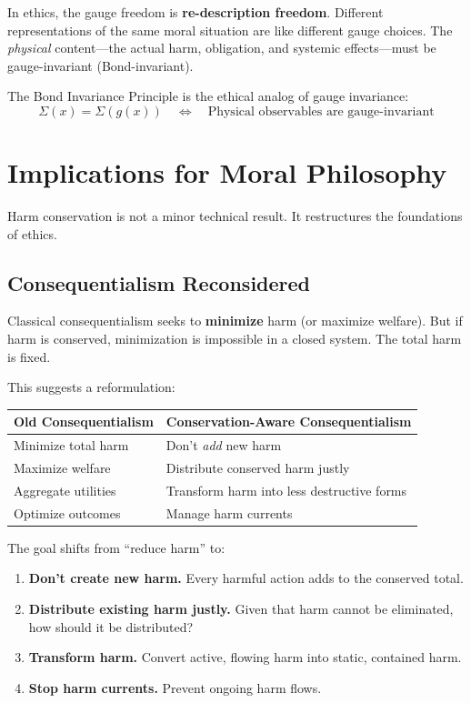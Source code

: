 \documentclass[12pt,letterpaper]{article}
\theoremstyle{definition}
\theoremstyle{remark}
\begin{document}
In ethics, the gauge freedom is \textbf{re-description freedom}. Different representations of the same moral situation are like different gauge choices. The \textit{physical} content---the actual harm, obligation, and systemic effects---must be gauge-invariant (Bond-invariant).

The Bond Invariance Principle is the ethical analog of gauge invariance:
\begin{equation}
\Sigma(x) = \Sigma(g(x)) \quad \Longleftrightarrow \quad \text{Physical observables are gauge-invariant}
\end{equation}

\section{Implications for Moral Philosophy}

Harm conservation is not a minor technical result. It restructures the foundations of ethics.

\subsection{Consequentialism Reconsidered}

Classical consequentialism seeks to \textbf{minimize} harm (or maximize welfare). But if harm is conserved, minimization is impossible in a closed system. The total harm is fixed.

This suggests a reformulation:

\begin{center}
\begin{tabular}{ll}
\toprule
\textbf{Old Consequentialism} & \textbf{Conservation-Aware Consequentialism} \\
\midrule
Minimize total harm & Don't \textit{add} new harm \\
Maximize welfare & Distribute conserved harm justly \\
Aggregate utilities & Transform harm into less destructive forms \\
Optimize outcomes & Manage harm currents \\
\bottomrule
\end{tabular}
\end{center}

The goal shifts from ``reduce harm'' to:
\begin{enumerate}
    \item \textbf{Don't create new harm.} Every harmful action adds to the conserved total.
    \item \textbf{Distribute existing harm justly.} Given that harm cannot be eliminated, how should it be distributed?
    \item \textbf{Transform harm.} Convert active, flowing harm into static, contained harm.
    \item \textbf{Stop harm currents.} Prevent ongoing harm flows.
\end{enumerate}
\end{document}

